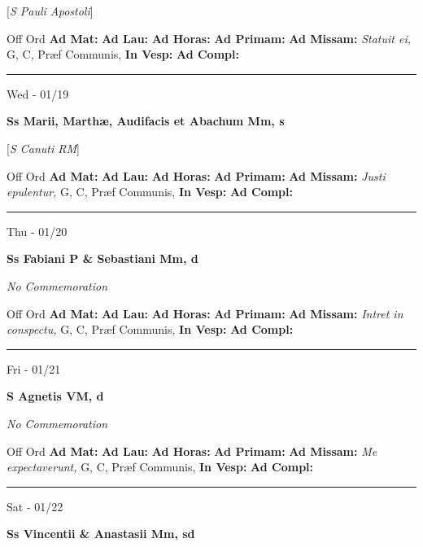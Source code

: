 \documentclass[letterpaper, 10pt]{article}
\begin{document}
[\textit{S Pauli Apostoli}]
\begin{justify}
Off Ord
\textbf{Ad Mat: }
\textbf{Ad Lau: }
\textbf{Ad Horas: }
\textbf{Ad Primam: }
\textbf{Ad Missam:} \textit{Statuit ei, } G, C, Præf Communis, 
\textbf{In Vesp: }
\textbf{Ad Compl: }\end{justify}



\hrule
\begin{center}
Wed - 01/19
\end{center}\textbf{ \large Ss Marii, Marthæ, Audifacis et Abachum Mm, \textnormal{\normalsize s}}

[\textit{S Canuti RM}]
\begin{justify}
Off Ord
\textbf{Ad Mat: }
\textbf{Ad Lau: }
\textbf{Ad Horas: }
\textbf{Ad Primam: }
\textbf{Ad Missam:} \textit{Justi epulentur, } G, C, Præf Communis, 
\textbf{In Vesp: }
\textbf{Ad Compl: }\end{justify}



\hrule
\begin{center}
Thu - 01/20
\end{center}\textbf{ \large Ss Fabiani P \& Sebastiani Mm, \textnormal{\normalsize d}}

\textit{No Commemoration}\begin{justify}
Off Ord
\textbf{Ad Mat: }
\textbf{Ad Lau: }
\textbf{Ad Horas: }
\textbf{Ad Primam: }
\textbf{Ad Missam:} \textit{Intret in conspectu, } G, C, Præf Communis, 
\textbf{In Vesp: }
\textbf{Ad Compl: }\end{justify}



\hrule
\begin{center}
Fri - 01/21
\end{center}\textbf{ \large S Agnetis VM, \textnormal{\normalsize d}}

\textit{No Commemoration}\begin{justify}
Off Ord
\textbf{Ad Mat: }
\textbf{Ad Lau: }
\textbf{Ad Horas: }
\textbf{Ad Primam: }
\textbf{Ad Missam:} \textit{Me expectaverunt, } G, C, Præf Communis, 
\textbf{In Vesp: }
\textbf{Ad Compl: }\end{justify}



\hrule
\begin{center}
Sat - 01/22
\end{center}\textbf{ \large Ss Vincentii \& Anastasii Mm, \textnormal{\normalsize sd}}
\end{document}
